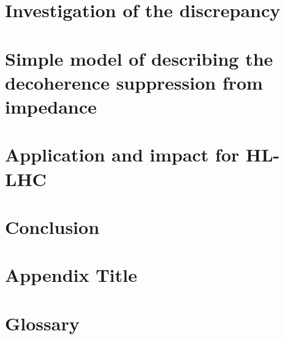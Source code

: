 \documentclass[12pt,twoside]{report} %
\begin{document}
\chapter{Investigation of the discrepancy}


\chapter{Simple model of describing the decoherence suppression from impedance}


\chapter{Application and impact for HL-LHC}


\chapter{Conclusion}


\printglossaries
\appendix
\chapter{Appendix Title}

\chapter{Glossary}


\backmatter
\printbibliography
{}
\end{document}
